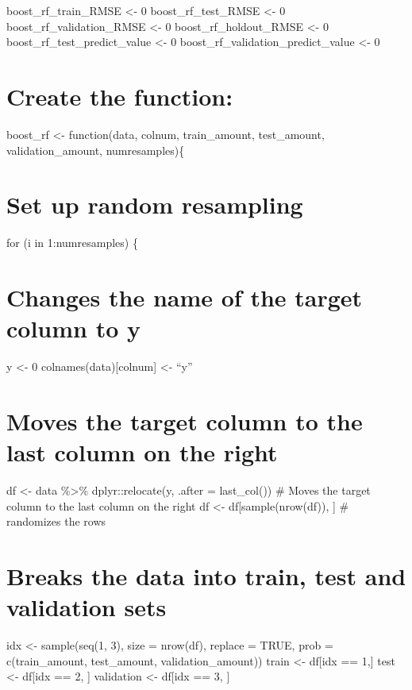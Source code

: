\documentclass[
]{book}
\begin{document}
boost\_rf\_train\_RMSE \textless- 0 boost\_rf\_test\_RMSE \textless- 0
boost\_rf\_validation\_RMSE \textless- 0 boost\_rf\_holdout\_RMSE \textless- 0
boost\_rf\_test\_predict\_value \textless- 0 boost\_rf\_validation\_predict\_value \textless-
0

\chapter{Create the function:}\label{create-the-function-1}

boost\_rf \textless- function(data, colnum, train\_amount, test\_amount,
validation\_amount, numresamples)\{

\chapter{Set up random resampling}\label{set-up-random-resampling-1}

for (i in 1:numresamples) \{

\chapter{Changes the name of the target column to y}\label{changes-the-name-of-the-target-column-to-y-1}

y \textless- 0 colnames(data){[}colnum{]} \textless- ``y''

\chapter{Moves the target column to the last column on the right}\label{moves-the-target-column-to-the-last-column-on-the-right-1}

df \textless- data \%\textgreater\% dplyr::relocate(y, .after = last\_col()) \# Moves the
target column to the last column on the right df \textless-
df{[}sample(nrow(df)), {]} \# randomizes the rows

\chapter{Breaks the data into train, test and validation sets}\label{breaks-the-data-into-train-test-and-validation-sets-1}

idx \textless- sample(seq(1, 3), size = nrow(df), replace = TRUE, prob =
c(train\_amount, test\_amount, validation\_amount)) train \textless- df{[}idx == 1,{]} test \textless- df{[}idx == 2, {]} validation \textless- df{[}idx == 3, {]}
\end{document}
